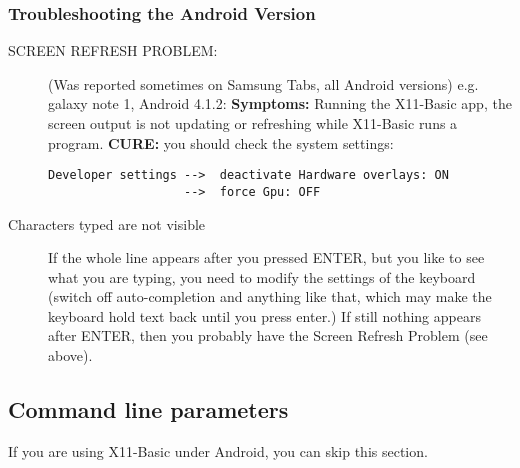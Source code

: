 \subsubsection*{Troubleshooting the Android Version}
\begin{description}

\item[SCREEN REFRESH PROBLEM:] (Was reported sometimes on Samsung Tabs, 
all Android versions) e.g. galaxy note 1, Android 4.1.2:
{\bf Symptoms:} Running the X11-Basic app, the screen output is not updating or 
refreshing while X11-Basic runs a program. 
{\bf CURE:} you should check the system settings:
\begin{verbatim}
Developer settings -->  deactivate Hardware overlays: ON 
                   -->  force Gpu: OFF 
\end{verbatim}

\item[Characters typed are not visible] If the whole line appears  after you
pressed ENTER, but you like to see what you are typing, you  need to modify the
settings of the keyboard (switch off auto-completion  and anything like that,
which may make the keyboard hold text back until you press enter.) If still 
nothing appears after ENTER, then you probably have the Screen Refresh Problem 
(see above).

\end{description}

%

\subsection{Command line parameters}

If you are using X11-Basic under Android, you can skip this section.

